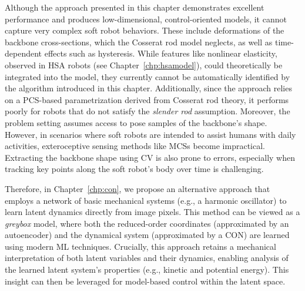 Although the approach presented in this chapter demonstrates excellent performance and produces low-dimensional, control-oriented models, it cannot capture very complex soft robot behaviors. These include deformations of the backbone cross-sections, which the Cosserat rod model neglects, as well as time-dependent effects such as hysteresis. While features like nonlinear elasticity, observed in \gls{HSA} robots (see Chapter~\ref{chp:hsamodel}), could theoretically be integrated into the model, they currently cannot be automatically identified by the algorithm introduced in this chapter.
Additionally, since the approach relies on a \gls{PCS}-based parametrization derived from Cosserat rod theory, it performs poorly for robots that do not satisfy the \emph{slender rod} assumption. Moreover, the problem setting assumes access to pose samples of the backbone’s shape. However, in scenarios where soft robots are intended to assist humans with daily activities, exteroceptive sensing methods like \glspl{MCS} become impractical. Extracting the backbone shape using \gls{CV} is also prone to errors, especially when tracking key points along the soft robot’s body over time is challenging. 

Therefore, in Chapter~\ref{chp:con}, we propose an alternative approach that employs a network of basic mechanical systems (e.g., a harmonic oscillator) to learn latent dynamics directly from image pixels. This method can be viewed as a \emph{greybox} model, where both the reduced-order coordinates (approximated by an autoencoder) and the dynamical system (approximated by a \gls{CON}) are learned using modern \gls{ML} techniques. Crucially, this approach retains a mechanical interpretation of both latent variables and their dynamics, enabling analysis of the learned latent system’s properties (e.g., kinetic and potential energy). This insight can then be leveraged for model-based control within the latent space.
